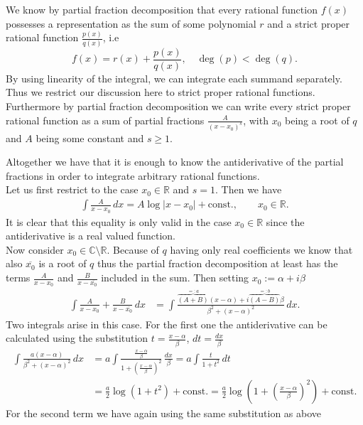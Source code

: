 

We know by partial fraction decomposition that every rational function $f(x)$ possesses a representation as the sum of some polynomial $r$ and a strict proper rational function $\frac{p(x)}{q(x)}$, i.e
$$
f(x) = r(x) + \frac{p(x)}{q(x)},\quad \deg(p)<\deg(q).
$$
By using linearity of the integral, we can integrate each summand separately. Thus we restrict our discussion here to strict proper rational functions. 
Furthermore by partial fraction decomposition we can write every strict proper rational function as a sum of partial fractions $\frac{A}{(x-x_{0})^{s}}$, with $x_{0}$ being a root of $q$ and $A$ being some constant and $s\geq 1$.

Altogether we have that it is enough to know the antiderivative of the partial fractions in order to integrate arbitrary rational functions.\\
Let us first restrict to the case $x_{0}\in\mathbb{R}$ and $s=1$. Then we have
\begin{align*}
\int \frac{A}{x-x_{0}}\, dx = A \log|x-x_{0}|+\text{const}.,\qquad x_{0}\in\mathbb{R}.
\end{align*}
It is clear that this equality is only valid in the case $x_{0}\in\mathbb{R}$ since the antiderivative is a real valued function.\\
Now consider $x_{0}\in\mathbb{C}\setminus\mathbb{R}$. Because of $q$ having only real coefficients we know that also $\overline{x_{0}}$ is a root of $q$ thus the partial fraction decomposition at least has the terms $\frac{A}{x-x_{0}}$ and $\frac{B}{x-\overline{x_{0}}}$ included in the sum. Then setting $x_{0}:=\alpha+i\beta$
\begin{align*}
\int \frac{A}{x-x_{0}}+\frac{B}{x-\overline{x_{0}}}\, dx &= \int \frac{\overbrace{(A+B)}^{=:a}(x-\alpha)+i\overbrace{(A-B)}^{=:b}\beta}{\beta^{2}+(x-\alpha)^{2}}\, dx.
\end{align*}
Two integrals arise in this case. For the first one the antiderivative can be calculated using the substitution $t=\frac{x-\alpha}{\beta}$, $dt = \frac{dx}{\beta}$
\begin{align*}
\int \frac{a(x-\alpha)}{\beta^{2}+(x-\alpha)^{2}}\, dx &= a\int \frac{\frac{x-\alpha}{\beta}}{1+(\frac{x-\alpha}{\beta})^{2}}\, \frac{dx}{\beta}=a\int \frac{t}{1+t^{2}}\,dt\\
& = \frac{a}{2}\log(1+t^{2})+\text{const}. = \frac{a}2\log\left(1+\left(\frac{x-\alpha}{\beta}\right)^{2}\right)+\text{const}.
\end{align*}
For the second term we have again using the same substitution as above
